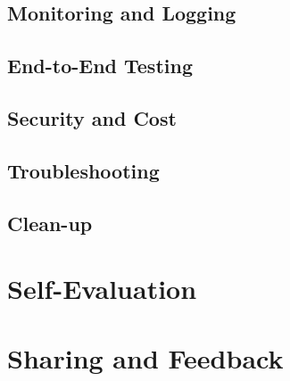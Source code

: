 \subsection{Monitoring and Logging}


\subsection{End-to-End Testing}


\subsection{Security and Cost}


\subsection{Troubleshooting}


\subsection{Clean-up}


\newpage

\section{Self-Evaluation}



\newpage

\section{Sharing and Feedback}



\newpage

